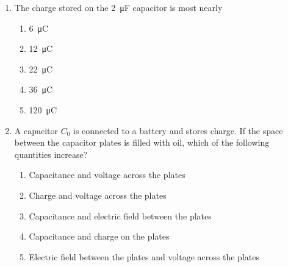\documentclass{../../../oss-classkick}
\begin{document}
\begin{multicols*}{2}
\begin{enumerate}[leftmargin=18pt,resume]
  \item The charge stored on the \SI{2}{\micro\farad} capacitor is most nearly
    \begin{enumerate}[nosep,leftmargin=18pt,label=(\Alph*)]
    \item\SI{6}{\micro\coulomb}
    \item\SI{12}{\micro\coulomb}
    \item\SI{22}{\micro\coulomb}
    \item\SI{36}{\micro\coulomb}
    \item\SI{120}{\micro\coulomb}
    \end{enumerate}
    \label{cap2}
    
  \item A capacitor $C_0$ is connected to a battery and stores charge. If the
    space between the capacitor plates is filled with oil, which of the
    following quantities increase?
    \begin{enumerate}[nosep,leftmargin=18pt,label=(\Alph*)]
    \item Capacitance and voltage across the plates
    \item Charge and voltage across the plates
    \item Capacitance and electric field between the plates
    \item Capacitance and charge on the plates
    \item Electric field between the plates and voltage across the plates
    \end{enumerate}
    \vspace{.7in}


\end{enumerate}
\end{multicols*}
\end{document}

